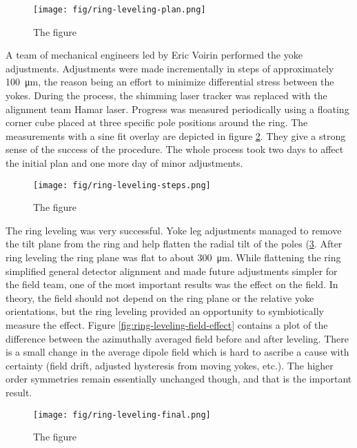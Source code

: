 \begin{figure}
\texttt{[image: fig/ring-leveling-plan.png]}
\caption{The figure}
\label{fig:ring-leveling-plan}
\end{figure}

A team of mechanical engineers led by Eric Voirin performed the yoke adjustments.  Adjustments were made incrementally in steps of approximately \SI{100}{\micro\meter}, the reason being an effort to minimize differential stress between the yokes.  During the process, the shimming laser tracker was replaced with the alignment team Hamar laser.  Progress was measured periodically using a floating corner cube placed at three specific pole positions around the ring.  The measurements with a sine fit overlay are depicted in figure \ref{fig:ring-leveling-steps}.  They give a strong sense of the success of the procedure.  The whole process took two days to affect the initial plan and one more day of minor adjustments.

\begin{figure}
\texttt{[image: fig/ring-leveling-steps.png]}
\caption{The figure}
\label{fig:ring-leveling-steps}
\end{figure}

The ring leveling was very successful.  Yoke leg adjustments managed to remove the tilt plane from the ring and help flatten the radial tilt of the poles (\ref{fig:ring-leveling-final}.  After ring leveling the ring plane was flat to about \SI{300}{\micro\meter}.  While flattening the ring simplified general \gmtwo detector alignment and made future adjustments simpler for the field team, one of the most important results was the effect on the field.  In theory, the field should not depend on the ring plane or the relative yoke orientations, but the ring leveling provided an opportunity to symbiotically measure the effect.  Figure \ref{fig:ring-leveling-field-effect} contains a plot of the difference between the azimuthally averaged field before and after leveling.  There is a small change in the average dipole field which is hard to ascribe a cause with certainty (field drift, adjusted hysteresis from moving yokes, etc.).  The higher order symmetries remain essentially unchanged though, and that is the important result.

\begin{figure}
\texttt{[image: fig/ring-leveling-final.png]}
\caption{The figure}
\label{fig:ring-leveling-final}
\end{figure}


